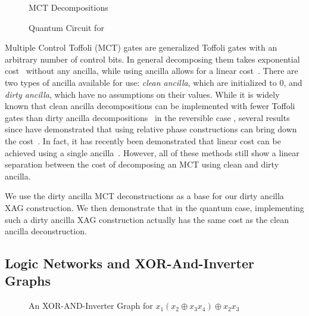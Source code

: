 \begin{figure}[t]
  \centering
  \begin{minipage}{\linewidth}
    \centering
    \scalebox{1.0} {
      
    }
    \label{fig-clean-mct}
  \end{minipage}
  \begin{minipage}{\linewidth}
    \centering
    \scalebox{1.0} {
      
    }
    \label{fig-dirty-mct}
  \end{minipage}
  \caption{MCT Decompositions}
  \label{fig-mct-decomp}
\end{figure}


\begin{figure}[t]
  \scalebox{0.8} {
    
  }
  \caption{Quantum Circuit for~}
  \label{fig-xag-qc} 
\end{figure}

Multiple Control Toffoli (MCT) gates are generalized Toffoli gates with an arbitrary number
of control bits. In general decomposing them takes exponential cost~\cite{bib-maslov-rtof}
without any ancilla, while using ancilla allows for a linear
cost~\cite{bib-barenco-elementary}. There are two types of ancilla available for use:
\emph{clean ancilla}, which are initialized to 0, and \emph{dirty ancilla}, which have no
assumptions on their values. While it is widely known that clean ancilla decompositions
can be implemented with fewer Toffoli gates than dirty ancilla
decompositions~\cite{bib-mike-and-ike} in the reversible case , several results since have
demonstrated that using relative phase constructions can bring down the
cost~\cite{bib-maslov-rtof, bib-amy-phase-state, bib-abdessaied-mct}. In fact, it has
recently been demonstrated that linear cost can be achieved using a single
ancilla~\cite{bib-zindorf-mct}. However, all of these methods still show a linear
separation between the cost of decomposing an MCT using clean and dirty ancilla.

We use the dirty ancilla MCT deconstructions as a base for our dirty ancilla XAG
construction. We then demonstrate that in the quantum case, implementing such a dirty
ancilla XAG construction actually has the same cost as the clean ancilla deconstruction.

\subsection{Logic Networks and XOR-And-Inverter Graphs}
\label{sub-xag}
\begin{figure}
  \centering
  \scalebox{1.0} {
    
  }
  \caption{An XOR-AND-Inverter Graph for $x_1(x_2 \oplus x_3x_4)\oplus x_2x_3$}
  \label{fig-xag}
\end{figure}


